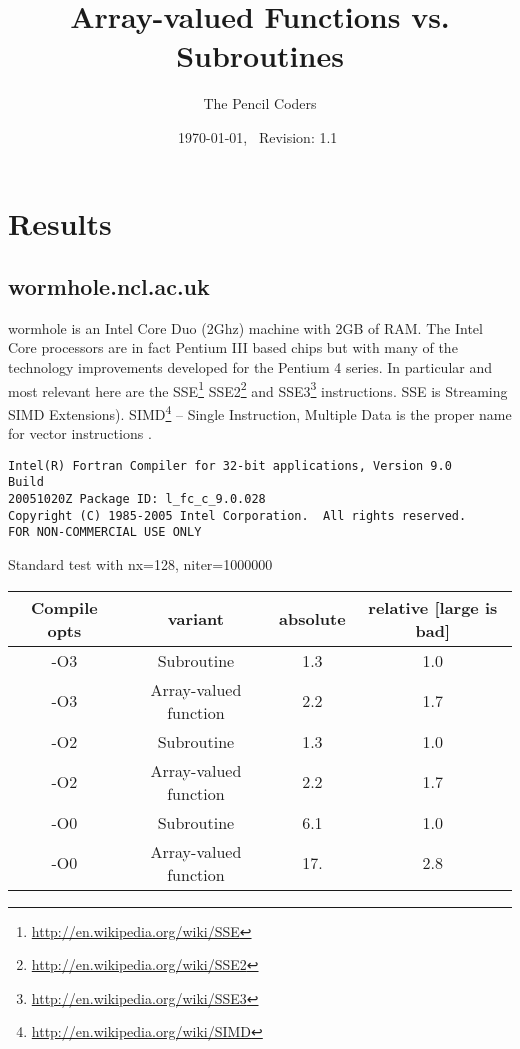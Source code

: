 \documentclass[a4paper,twoside,12pt]{article}
\newcommand{\fnurl}[1]{\footnote{\url{#1}}}
\begin{document}
\title{Array-valued Functions vs. Subroutines} %
\author{The Pencil Coders}          %
\date{\today,~ $ $Revision: 1.1 $ $}            %

\maketitle
\label{firstpage}


\chapter{Results} 
\section{wormhole.ncl.ac.uk}
wormhole is an Intel Core Duo (2Ghz) machine with 2GB of RAM.  The Intel
Core processors are in fact Pentium III based chips but with many of the
technology improvements developed for the Pentium 4 series.  In particular
and most relevant here are the
SSE\fnurl{http://en.wikipedia.org/wiki/SSE}
SSE2\fnurl{http://en.wikipedia.org/wiki/SSE2} and
SSE3\fnurl{http://en.wikipedia.org/wiki/SSE3} instructions.  SSE is Streaming
SIMD Extensions). SIMD\fnurl{http://en.wikipedia.org/wiki/SIMD} -- Single Instruction, Multiple Data is the proper
name for vector instructions .
\begin{verbatim}
Intel(R) Fortran Compiler for 32-bit applications, Version 9.0    Build
20051020Z Package ID: l_fc_c_9.0.028
Copyright (C) 1985-2005 Intel Corporation.  All rights reserved.
FOR NON-COMMERCIAL USE ONLY
\end{verbatim}

Standard test with nx=128, niter=1000000

\begin{tabular}{cccc}
   Compile opts     &       variant       &     absolute & relative [large is bad] \\
\hline
   -O3     &  Subroutine            &    1.3    &   1.0 \\
   -O3     &  Array-valued function &    2.2    &   1.7 \\
\hline
   -O2     &  Subroutine            &    1.3    &   1.0 \\
   -O2     &  Array-valued function &    2.2    &   1.7 \\
\hline
   -O0     &  Subroutine            &    6.1    &   1.0 \\
   -O0     &  Array-valued function &    17.    &   2.8 \\
\hline
\end{tabular}
\end{document}
